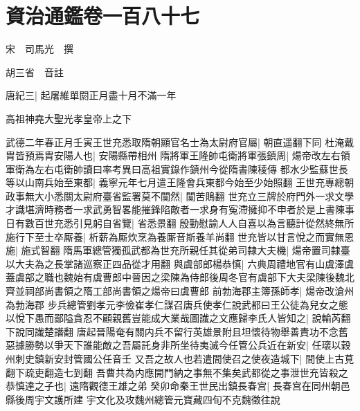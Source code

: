 \chapter{資治通鑑卷一百八十七}
宋　司馬光　撰

胡三省　音註

唐紀三|{
	起屠維單閼正月盡十月不滿一年}


高祖神堯大聖光孝皇帝上之下

武德二年春正月壬寅王世充悉取隋朝顯官名士為太尉府官屬|{
	朝直遥翻下同}
杜淹戴胄皆預焉胄安陽人也|{
	安陽縣帶相州}
隋將軍王隆帥屯衛將軍張鎮周|{
	煬帝改左右領軍衛為左右屯衛帥讀曰率考異曰高祖實錄作鎮州今從隋書陳稜傳}
都水少監蘇世長等以山南兵始至東都|{
	義寧元年七月遣王隆會兵東都今始至少始照翻}
王世充專總朝政事無大小悉關太尉府臺省監署莫不闃然|{
	闃苦鵙翻}
世充立三牌於府門外一求文學才識堪濟時務者一求武勇智畧能摧鋒陷敵者一求身有寃滯擁抑不申者於是上書陳事日有數百世充悉引見躬自省覽|{
	省悉景翻}
殷勤慰諭人人自喜以為言聽計從然終無所施行下至士卒厮養|{
	析薪為厮炊烹為養厮音斯養羊尚翻}
世充皆以甘言悅之而實無恩施|{
	施式智翻}
隋馬軍總管獨孤武都為世充所親任其從弟司隸大夫機|{
	煬帝置司隸臺以大夫為之長掌諸巡察正四品從才用翻}
與虞部郎楊恭慎|{
	六典周禮地官有山虞澤虞蓋虞部之職也魏始有虞曹郎中晉因之梁陳為侍郎後周冬官有虞部下大夫梁陳後魏北齊並祠部尚書領之隋工部尚書領之煬帝曰虞曹郎}
前勃海郡主簿孫師孝|{
	煬帝改滄州為勃海郡}
步兵總管劉孝元李儉崔孝仁謀召唐兵使孝仁說武都曰王公徒為兒女之態以悅下愚而鄙隘貪忍不顧親舊豈能成大業哉圖䜟之文應歸李氏人皆知之|{
	說輸芮翻下說同䜟楚譖翻}
唐起晉陽奄有關内兵不留行英雄景附且坦懷待物舉善責功不念舊惡據勝勢以爭天下誰能敵之吾屬託身非所坐待夷滅今任管公兵近在新安|{
	任瓌以穀州刺史鎮新安封管國公任音壬}
又吾之故人也若遣間使召之使夜造城下|{
	間使上古莧翻下疏吏翻造七到翻}
吾曹共為内應開門納之事無不集矣武都從之事泄世充皆殺之恭慎達之子也|{
	遠隋觀德王雄之弟}
癸卯命秦王世民出鎮長春宫|{
	長春宫在同州朝邑縣後周宇文護所建}
宇文化及攻魏州總管元寶藏四旬不克魏徵往說

